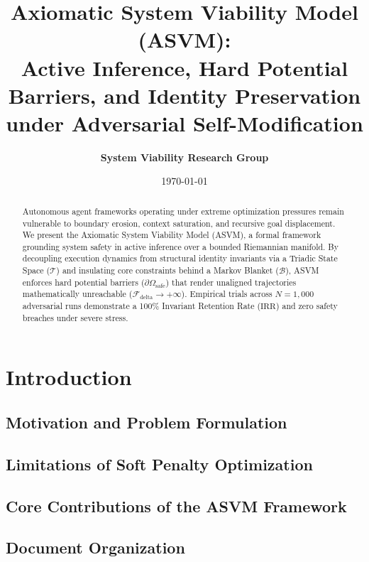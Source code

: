 \documentclass[11pt,a4paper]{article}
\title{\textbf{Axiomatic System Viability Model (ASVM):}\\
\Large Active Inference, Hard Potential Barriers, and Identity Preservation under Adversarial Self-Modification}
\author{\textbf{System Viability Research Group}}
\date{\today}
\begin{document}
\maketitle

\begin{abstract}
Autonomous agent frameworks operating under extreme optimization pressures remain vulnerable to boundary erosion, context saturation, and recursive goal displacement. We present the Axiomatic System Viability Model (ASVM), a formal framework grounding system safety in active inference over a bounded Riemannian manifold. By decoupling execution dynamics from structural identity invariants via a Triadic State Space ($\mathcal{T}$) and insulating core constraints behind a Markov Blanket ($\mathcal{B}$), ASVM enforces hard potential barriers ($\partial \Omega_{\text{safe}}$) that render unaligned trajectories mathematically unreachable ($\mathcal{F}_{\text{delta}} \to +\infty$). Empirical trials across $N = 1,000$ adversarial runs demonstrate a 100\% Invariant Retention Rate ($\text{IRR}$) and zero safety breaches under severe stress.
\end{abstract}

\clearpage

\renewcommand{\cftsecleader}{\cftdotfill{\cftdotsep}}
\tableofcontents

\clearpage


\section{Introduction}
\label{sec:introduction}
\subsection{Motivation and Problem Formulation}
\subsection{Limitations of Soft Penalty Optimization}
\subsection{Core Contributions of the ASVM Framework}
\subsection{Document Organization}
\end{document}
